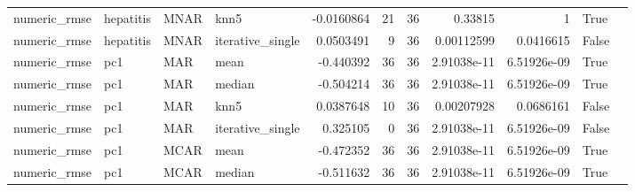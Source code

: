 \begin{table}[ht]
\begin{tabular}{llllrrrrrll}
 numeric\_rmse           & hepatitis            & MNAR        & knn5             &     -0.0160864   &                  21 &      36 & 0.33815     & 1           & True               &                                                                                                                    \\
 numeric\_rmse           & hepatitis            & MNAR        & iterative\_single &      0.0503491   &                   9 &      36 & 0.00112599  & 0.0416615   & False              &                                                                                                                    \\
 numeric\_rmse           & pc1                  & MAR         & mean             &     -0.440392    &                  36 &      36 & 2.91038e-11 & 6.51926e-09 & True               &                                                                                                                    \\
 numeric\_rmse           & pc1                  & MAR         & median           &     -0.504214    &                  36 &      36 & 2.91038e-11 & 6.51926e-09 & True               &                                                                                                                    \\
 numeric\_rmse           & pc1                  & MAR         & knn5             &      0.0387648   &                  10 &      36 & 0.00207928  & 0.0686161   & False              &                                                                                                                    \\
 numeric\_rmse           & pc1                  & MAR         & iterative\_single &      0.325105    &                   0 &      36 & 2.91038e-11 & 6.51926e-09 & False              &                                                                                                                    \\
 numeric\_rmse           & pc1                  & MCAR        & mean             &     -0.472352    &                  36 &      36 & 2.91038e-11 & 6.51926e-09 & True               &                                                                                                                    \\
 numeric\_rmse           & pc1                  & MCAR        & median           &     -0.511632    &                  36 &      36 & 2.91038e-11 & 6.51926e-09 & True               &                                                                                                                    \\

\end{tabular}
\end{table}

